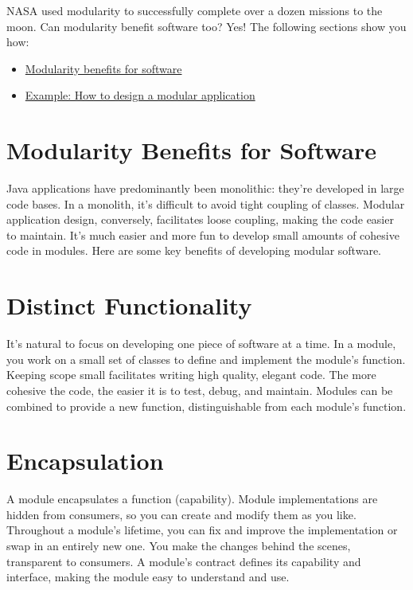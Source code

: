 NASA used modularity to successfully complete over a dozen missions to
the moon. Can modularity benefit software too? Yes! The following
sections show you how:

\begin{itemize}
\tightlist
\item
  \hyperref[modularity-benefits-for-software]{Modularity benefits for
  software}
\item
  \hyperref[example-designing-a-modular-application]{Example: How to
  design a modular application}
\end{itemize}

\section{Modularity Benefits for
Software}\label{modularity-benefits-for-software}

Java applications have predominantly been monolithic: they're developed
in large code bases. In a monolith, it's difficult to avoid tight
coupling of classes. Modular application design, conversely, facilitates
loose coupling, making the code easier to maintain. It's much easier and
more fun to develop small amounts of cohesive code in modules. Here are
some key benefits of developing modular software.

\section{Distinct Functionality}\label{distinct-functionality}

It's natural to focus on developing one piece of software at a time. In
a module, you work on a small set of classes to define and implement the
module's function. Keeping scope small facilitates writing high quality,
elegant code. The more cohesive the code, the easier it is to test,
debug, and maintain. Modules can be combined to provide a new function,
distinguishable from each module's function.

\section{Encapsulation}\label{encapsulation}

A module encapsulates a function (capability). Module implementations
are hidden from consumers, so you can create and modify them as you
like. Throughout a module's lifetime, you can fix and improve the
implementation or swap in an entirely new one. You make the changes
behind the scenes, transparent to consumers. A module's contract defines
its capability and interface, making the module easy to understand and
use.

